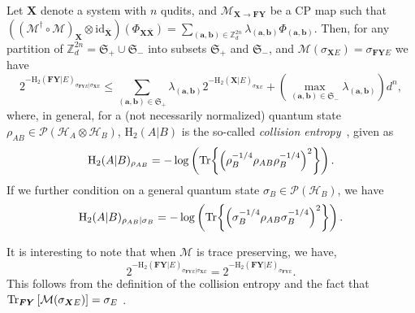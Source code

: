 \begin{lemma} 
\label{thm:entaglementSamplingResult}
Let $\mathbf{X}$ denote a system with $n$ qudits, and  $\mathcal{M}_{\mathbf{X}\rightarrow \mathbf{F}\mathbf{Y}}$ be a CP map such that $((\mathcal{M}^\dagger \circ \mathcal{M})_{\mathbf{X}}\otimes \text{id}_{\bar{\mathbf{X}}})(\Phi_{\mathbf{X}\bar{\mathbf{X}}}) = \sum_{(\bm{a},\bm{b})\in\mathbb{Z}^{2n}_d} \lambda_{(\bm{a},\bm{b})} \Phi_{(\bm{a},\bm{b})}$. Then, for any partition of $\mathbb{Z}^{2n}_d = \mathfrak{S}_+ \cup \mathfrak{S}_-$ into subsets $\mathfrak{S}_+$ and $\mathfrak{S}_-$, and $\mathcal{M}(\sigma_{\mathbf{X}E}) = \sigma_{\mathbf{F}\mathbf{Y}E}$ we have 
\begin{equation}
    2^{-\text{H}_2(\mathbf{F}\mathbf{Y} | E)_{\sigma_{\mathbf{F}\mathbf{Y}E} | \sigma_{\mathbf{X}E}}} \leq \sum_{(\bm{a},\bm{b})\in\mathfrak{S}_+} \lambda_{(\bm{a},\bm{b})} 2^{-\text{H}_2(\mathbf{X} | E)_{\sigma_{\mathbf{X}E}}} + (\max_{(\bm{a},\bm{b})\in\mathfrak{S}_-} \lambda_{(\bm{a},\bm{b})}) d^n,
\end{equation}
 where, in general, for a (not necessarily normalized) quantum state $\rho_{AB}\in \mathcal{P}(\mathcal{H}_A\otimes\mathcal{H}_B)$, $\text{H}_2(A|B)$   is the so-called \textit{collision entropy}~\cite{R06}, given as 
\begin{equation*} 
    \text{H}_2(A|B)_{\rho_{AB}}=-\log \left(\Tr{\left(\rho_{B}^{-1/4}\rho_{AB}\rho_B^{-1/4}\right)^2}\right).
\end{equation*}
If we further condition on a general quantum state $\sigma_B\in\mathcal{P}(\mathcal{H}_B)$, we have 
\begin{equation*}
    \text{H}_2(A|B)_{\rho_{AB}|\sigma_B}=-\log \left(\Tr{\left(\sigma_{B}^{-1/4}\rho_{AB}\sigma_B^{-1/4}\right)^2}\right).
\end{equation*}
\end{lemma}

It is interesting to note that when $\mathcal{M}$ is trace preserving, we have,
$$2^{-\text{H}_2(\mathbf{F}\mathbf{Y} | E)_{\sigma_{\mathbf{F}\mathbf{Y}E} | \sigma_{\mathbf{X}E}}} = 2^{-\text{H}_2(\mathbf{F}\mathbf{Y} | E)_{\sigma_{\mathbf{F}\mathbf{Y}E}}}.$$
This follows from the definition of the collision entropy and the fact that $\Tr_{\bm{F} \bm{Y}}\left[ \mathcal{M}(\sigma_{\bm{X} E}) \right] = \sigma_{E}$ \citep{Dupuis2015}. 



